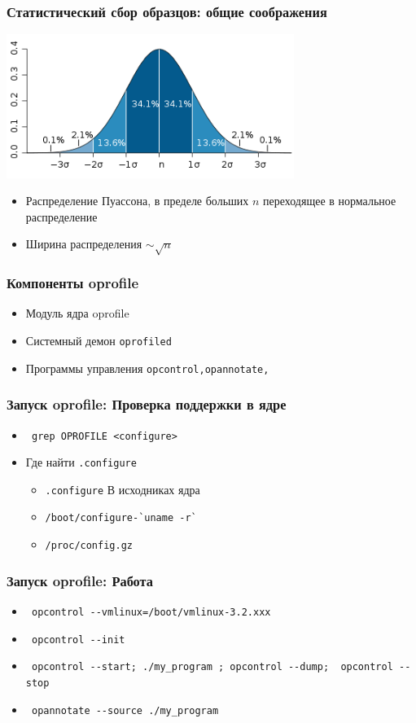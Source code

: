 \begin{frame}
 \frametitle{Статистический сбор образцов: общие соображения}
 \includegraphics[width=0.7\textwidth]{../../slides/profile/Standard_deviation_diagram.png}
 \begin{itemize}
   \item Распределение Пуассона, в пределе больших $n$ переходящее в нормальное распределение
   \item Ширина распределения $\sim \sqrt{n}$
 \end{itemize}
\end{frame}

\begin{frame}
 \frametitle{Компоненты oprofile}
  \begin{itemize}
    \item Модуль ядра oprofile
    \item Системный демон \texttt{oprofiled}
    \item Программы управления \texttt{opcontrol,opannotate,}
  \end{itemize}
\end{frame}


\begin{frame}[fragile]
 \frametitle{Запуск oprofile: Проверка поддержки в ядре}
 \begin{itemize}
   \item \verb+ grep OPROFILE <configure>+
   \item Где найти \texttt{.configure}
     \begin{itemize}
      \item \texttt{.configure} В исходниках ядра
      \item \verb+/boot/configure-`uname -r`+
      \item \verb+/proc/config.gz+
     \end{itemize}
  \end{itemize}
\end{frame} 


\begin{frame}[fragile]
 \frametitle{Запуск oprofile: Работа}
 \begin{itemize}
  \item \verb+ opcontrol --vmlinux=/boot/vmlinux-3.2.xxx+ 
  \item \verb+ opcontrol --init+
  \item \verb+ opcontrol --start; ./my_program ; opcontrol --dump;  opcontrol --stop+
  \item \verb+ opannotate --source ./my_program +
 \end{itemize}
\end{frame}

